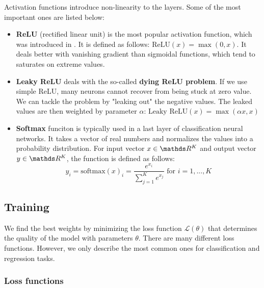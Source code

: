 Activation functions introduce non-linearity to the layers. Some of the most
important ones are listed below:
\begin{itemize}
    \item \textbf{ReLU} (rectified linear unit) is the most popular activation
          function, which was introduced in \cite{pmlr-v15-glorot11a}. It is defined
          as follows: $\text{ReLU}(x) = \max(0, x)$. It deals better with vanishing
          gradient than sigmoidal functions, which tend to saturates on extreme values.
    \item \textbf{Leaky ReLU} deals with the so-called
          \textbf{dying ReLU problem}. If we use simple ReLU, many neurons cannot
          recover from being stuck at zero value. We can tackle the problem by
          "leaking out" the negative values. The leaked values are then weighted by
          parameter $\alpha$: $\text{Leaky ReLU}(x) = \max(\alpha x, x)$
    \item \textbf{Softmax} funciton is typically used in a last layer of
          classification neural networks. It takes a vector of real numbers and
          normalizes the values into a probability distribution. For input vector
          $x \in \real^K$ and output vector $y \in \real^K$, the function is defined
          as follows:
          $$
              y_i = \text{softmax}(x)_i = \frac{e^{x_i}}{\sum\limits^{K}_{j = 1}
                  e^{x_j}} \text{ for } i = 1,...,K
          $$
\end{itemize}

\subsection{Training}
\label{sec:training}
We find the best weights by minimizing the loss function $\mathcal{L(\theta)}$
that determines the quality of the model with parameters $\theta$. There are
many different loss functions. However, we only describe the most common ones
for classification and regression tasks.

\subsubsection{Loss functions}

